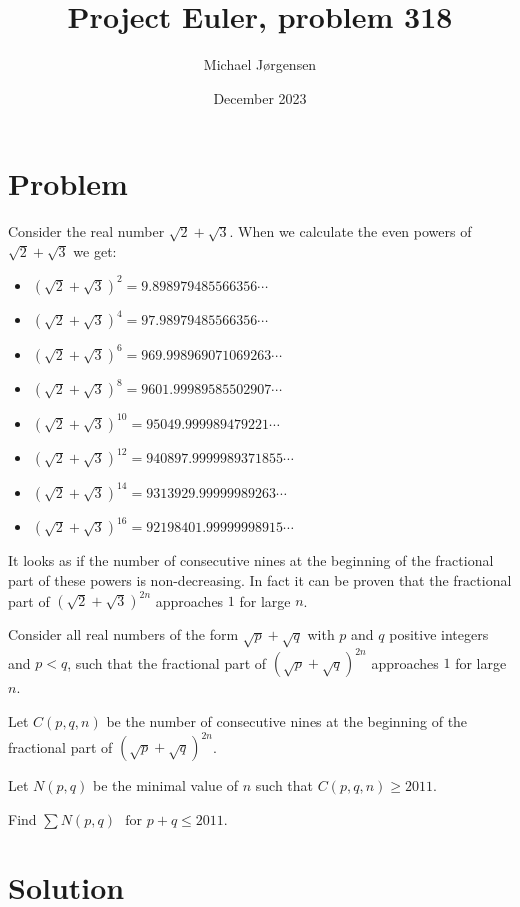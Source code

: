 \documentclass[12pt,oneside,a4paper]{article}
\title{Project Euler, problem 318}
\date{December 2023}
\author{Michael Jørgensen}
\begin{document}
\maketitle
\section{Problem}

Consider the real number $\sqrt 2 + \sqrt 3$.
When we calculate the even powers of $\sqrt 2 + \sqrt 3$
we get:
\begin{itemize}
    \item ${(\sqrt 2 + \sqrt 3)}^2 = 9.898979485566356 \cdots $
    \item ${(\sqrt 2 + \sqrt 3)}^4 = 97.98979485566356 \cdots $
    \item ${(\sqrt 2 + \sqrt 3)}^6 = 969.998969071069263 \cdots $
    \item ${(\sqrt 2 + \sqrt 3)}^8 = 9601.99989585502907 \cdots $
    \item ${(\sqrt 2 + \sqrt 3)}^{10} = 95049.999989479221 \cdots $
    \item ${(\sqrt 2 + \sqrt 3)}^{12} = 940897.9999989371855 \cdots $
    \item ${(\sqrt 2 + \sqrt 3)}^{14} = 9313929.99999989263 \cdots $
    \item ${(\sqrt 2 + \sqrt 3)}^{16} = 92198401.99999998915 \cdots $
\end{itemize}

It looks as if the number of consecutive nines at the beginning of the fractional part of
these powers is non-decreasing.  In fact it can be proven that the fractional part of
${(\sqrt 2 + \sqrt 3)}^{2 n}$ approaches $1$ for large $n$.

Consider all real numbers of the form $\sqrt p + \sqrt q$ with $p$ and $q$ positive
integers and $p<q$, such that the fractional part of ${(\sqrt p + \sqrt q)}^{2n}$
approaches $1$ for large $n$.

Let $C(p,q,n)$ be the number of consecutive nines at the beginning of the fractional part
of ${(\sqrt p + \sqrt q)}^{2n}$.

Let $N(p,q)$ be the minimal value of $n$ such that $C(p,q,n) \ge 2011$.

Find $\displaystyle \sum N(p,q) \,\, \text{ for } p+q \le 2011$.


\section{Solution}
\end{document}
